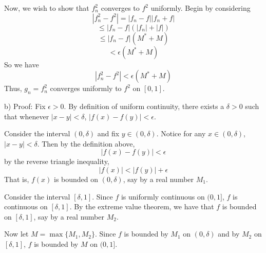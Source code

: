 \documentclass{article}
\begin{document}
\begin{enumerate}
    Now, we wish to show that $f_n^2$ converges to $f^2$ uniformly. Begin by considering
    \[|f_n^2 - f^2| = |f_n - f| |f_n + f|\]
    \[\leq |f_n - f| (|f_n| + |f|)\]
    \[\leq |f_n - f| (M^* + M)\]
    \[< \epsilon (M^* + M)\]
    So we have
    \[|f_n^2 - f^2| < \epsilon (M^* + M)\]
    Thus, $g_n = f_n^2$ converges uniformly to $f^2$ on $[0,1]$.
    
    b) Proof: Fix $\epsilon > 0$. By definition of uniform continuity, there exists a $\delta > 0$ such that whenever $|x - y| < \delta$, $|f(x) - f(y)| < \epsilon$.
    
    Consider the interval $(0, \delta)$ and fix $y \in (0, \delta)$. Notice for any $x \in (0, \delta)$, $|x - y| < \delta$. Then by the definition above, 
    \[|f(x) - f(y)| < \epsilon\]
    by the reverse triangle inequality,
    \[|f(x)| < |f(y)| + \epsilon\]
    That is, $f(x)$ is bounded on $(0, \delta)$, say by a real number $M_1$. 
    
    Consider the interval $[\delta, 1]$. Since $f$ is uniformly continuous on $(0,1]$, $f$ is continuous on $[\delta, 1]$. By the extreme value theorem, we have that $f$ is bounded on $[\delta,1]$, say by a real number $M_2$.
    
    Now let $M = \max\{M_1,M_2\}$. Since $f$ is bounded by $M_1$ on $(0,\delta)$ and by $M_2$ on $[\delta, 1]$, $f$ is bounded by $M$ on $(0, 1]$.
\end{enumerate}
\end{document}
